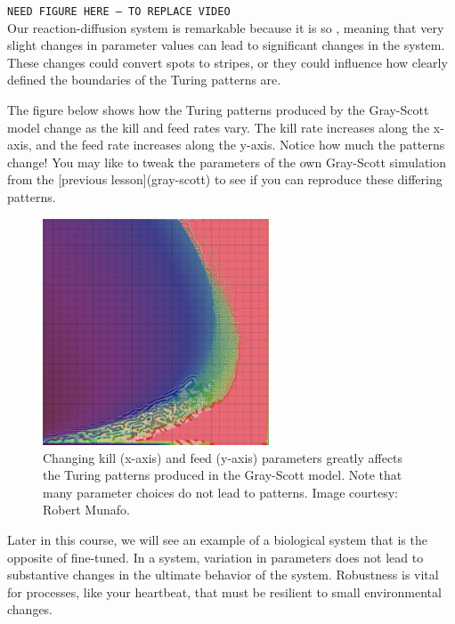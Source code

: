 {{\texttt{NEED FIGURE HERE -- TO REPLACE VIDEO}\\

Our reaction-diffusion system is remarkable because it is so , meaning that very slight changes in parameter values can lead to significant changes in the system. These changes could convert spots to stripes, or they could influence how clearly defined the boundaries of the Turing patterns are.

The figure below shows how the Turing patterns produced by the Gray-Scott model change as the kill and feed rates vary. The kill rate increases along the x-axis, and the feed rate increases along the y-axis. Notice how much the patterns change! You may like to tweak the parameters of the own Gray-Scott simulation from the [previous lesson](gray-scott) to see if you can reproduce these differing patterns.

\begin{figure}[h]
\centering
\mySfFamily
\includegraphics[width = 0.6\textwidth]{../assets/images/600px/xmorphia-parameter-map.jpg}
\caption{Changing kill (x-axis) and feed (y-axis) parameters greatly affects the Turing patterns produced in the Gray-Scott model. Note that many parameter choices do not lead to patterns. Image courtesy: Robert Munafo.}
\label{fig:xmorphia-parameter-map}
\end{figure}

Later in this course, we will see an example of a biological system that is the opposite of fine-tuned. In a  system, variation in parameters does not lead to substantive changes in the ultimate behavior of the system. Robustness is vital for processes, like your heartbeat, that must be resilient to small environmental changes.

}}
